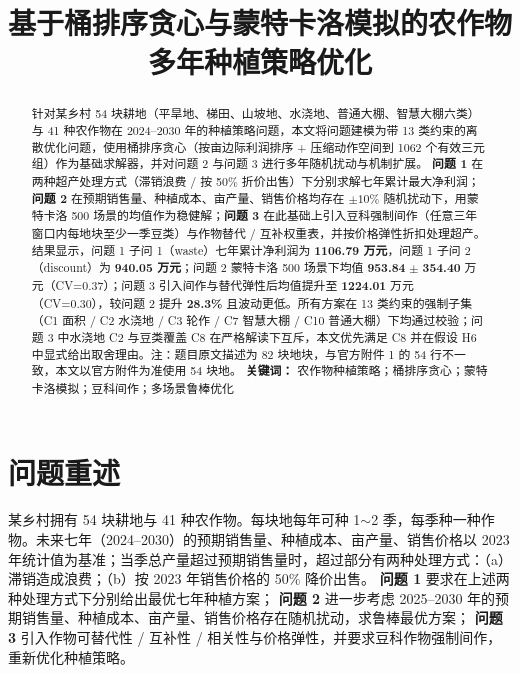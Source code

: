 \documentclass[UTF8,a4paper,12pt]{ctexart}
\title{基于桶排序贪心与蒙特卡洛模拟的农作物多年种植策略优化}
\author{}
\date{}
\begin{document}
\maketitle
\thispagestyle{plain}

\begin{abstract}
针对某乡村 54 块耕地（平旱地、梯田、山坡地、水浇地、普通大棚、智慧大棚六类）与 41 种农作物在 2024--2030 年的种植策略问题，本文将问题建模为带 13 类约束的离散优化问题，使用桶排序贪心（按亩边际利润排序 + 压缩动作空间到 1062 个有效三元组）作为基础求解器，并对问题 2 与问题 3 进行多年随机扰动与机制扩展。
\textbf{问题 1} 在两种超产处理方式（滞销浪费 / 按 50\% 折价出售）下分别求解七年累计最大净利润；\textbf{问题 2} 在预期销售量、种植成本、亩产量、销售价格均存在 $\pm 10\%$ 随机扰动下，用蒙特卡洛 500 场景的均值作为稳健解；\textbf{问题 3} 在此基础上引入豆科强制间作（任意三年窗口内每地块至少一季豆类）与作物替代 / 互补权重表，并按价格弹性折扣处理超产。结果显示，问题 1 子问 1（waste）七年累计净利润为 \textbf{1106.79 万元}，问题 1 子问 2（discount）为 \textbf{940.05 万元}；问题 2 蒙特卡洛 500 场景下均值 \textbf{953.84} $\pm$ \textbf{354.40} 万元（CV=0.37）；问题 3 引入间作与替代弹性后均值提升至 \textbf{1224.01} 万元（CV=0.30），较问题 2 提升 \textbf{28.3\%} 且波动更低。所有方案在 13 类约束的强制子集（C1 面积 / C2 水浇地 / C3 轮作 / C7 智慧大棚 / C10 普通大棚）下均通过校验；问题 3 中水浇地 C2 与豆类覆盖 C8 在严格解读下互斥，本文优先满足 C8 并在假设 H6 中显式给出取舍理由。注：题目原文描述为 82 块地块，与官方附件 1 的 54 行不一致，本文以官方附件为准使用 54 块地。
\textbf{关键词：} 农作物种植策略；桶排序贪心；蒙特卡洛模拟；豆科间作；多场景鲁棒优化
\end{abstract}
\newpage

\section{问题重述}
某乡村拥有 54 块耕地与 41 种农作物。每块地每年可种 1$\sim$2 季，每季种一种作物。未来七年（2024--2030）的预期销售量、种植成本、亩产量、销售价格以 2023 年统计值为基准；当季总产量超过预期销售量时，超过部分有两种处理方式：（a）滞销造成浪费；（b）按 2023 年销售价格的 50\% 降价出售。
\textbf{问题 1} 要求在上述两种处理方式下分别给出最优七年种植方案；
\textbf{问题 2} 进一步考虑 2025--2030 年的预期销售量、种植成本、亩产量、销售价格存在随机扰动，求鲁棒最优方案；
\textbf{问题 3} 引入作物可替代性 / 互补性 / 相关性与价格弹性，并要求豆科作物强制间作，重新优化种植策略。
\end{document}
